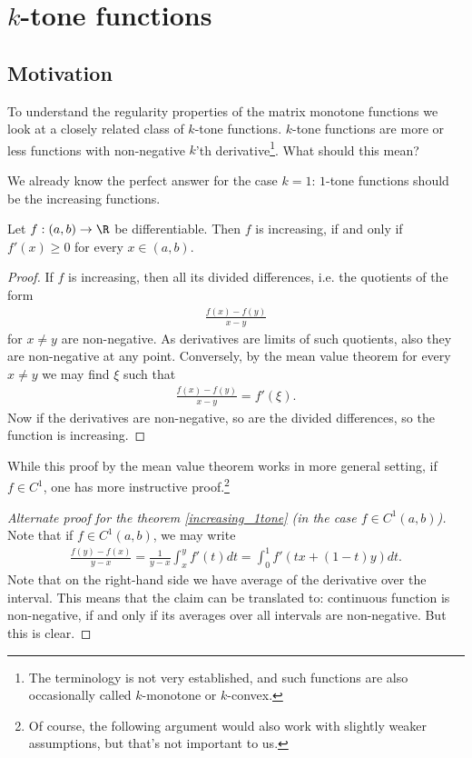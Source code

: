 \chapter{$k$-tone functions}

\section{Motivation}

To understand the regularity properties of the matrix monotone functions we look at a closely related class of $k$-tone functions. $k$-tone functions are more or less functions with non-negative $k$'th derivative\footnote{The terminology is not very established, and such functions are also occasionally called $k$-monotone or $k$-convex.}. What should this mean?

We already know the perfect answer for the case $k = 1$: $1$-tone functions should be the increasing functions.

\begin{lause}\label{increasing_1tone}
	Let $f : (a, b) \to \R$ be differentiable. Then $f$ is increasing, if and only if $f'(x) \geq 0$ for every $x \in (a, b)$.
\end{lause}

\begin{proof}
	If $f$ is increasing, then all its divided differences, i.e. the quotients of the form
	\begin{align*}
		\frac{f(x) - f(y)}{x - y}
	\end{align*}
	for $x \neq y$ are non-negative. As derivatives are limits of such quotients, also they are non-negative at any point. Conversely, by the mean value theorem for every $x \neq y$ we may find $\xi$ such that
	\begin{align*}
		\frac{f(x) - f(y)}{x - y} = f'(\xi).
	\end{align*}
	Now if the derivatives are non-negative, so are the divided differences, so the function is increasing.
\end{proof}

While this proof by the mean value theorem works in more general setting, if $f \in C^{1}$, one has more instructive proof.\footnote{Of course, the following argument would also work with slightly weaker assumptions, but that's not important to us.}

\begin{proof}[Alternate proof for the theorem \ref{increasing_1tone} (in the case $f \in C^{1}(a, b)$)]
	Note that if $f \in C^{1}(a, b)$, we may write
	\begin{align*}
		\frac{f(y) - f(x)}{y - x} = \frac{1}{y - x}\int_{x}^{y} f'(t) dt = \int_{0}^{1} f'(t x + (1 - t) y) dt.
	\end{align*}
	Note that on the right-hand side we have average of the derivative over the interval. This means that the claim can be translated to: continuous function is non-negative, if and only if its averages over all intervals are non-negative. But this is clear.
\end{proof}

